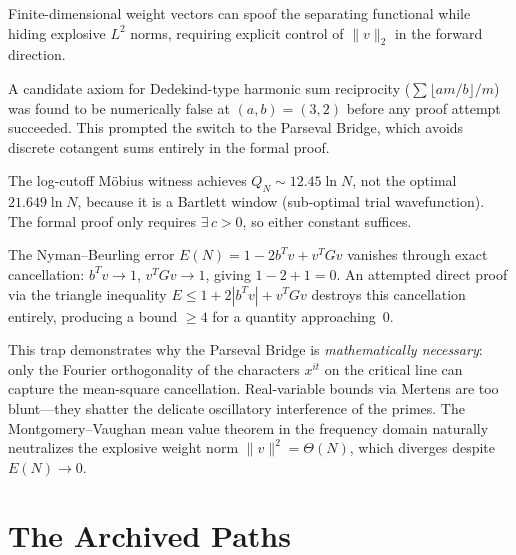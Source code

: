 \documentclass[11pt,a4paper]{article}
\begin{document}
\begin{discovery}
Finite-dimensional weight vectors can spoof the separating functional
while hiding explosive $L^2$ norms, requiring explicit control of
$\|v\|_2$ in the forward direction.
\end{discovery}

\begin{discovery}
A candidate axiom for Dedekind-type harmonic sum reciprocity
($\sum \lfloor am/b \rfloor / m$) was found to be numerically false
at $(a,b) = (3,2)$ before any proof attempt succeeded. This prompted
the switch to the Parseval Bridge, which avoids discrete cotangent
sums entirely in the formal proof.
\end{discovery}

\begin{discovery}
The log-cutoff M\"obius witness achieves $Q_N \sim 12.45 \ln N$, not
the optimal $21.649 \ln N$, because it is a Bartlett window (sub-optimal
trial wavefunction). The formal proof only requires $\exists\,c > 0$,
so either constant suffices.
\end{discovery}

\begin{discovery}
\label{disc:triangle}
The Nyman--Beurling error $E(N) = 1 - 2b^Tv + v^TGv$ vanishes through
exact cancellation: $b^Tv \to 1$, $v^TGv \to 1$, giving $1-2+1=0$.
An attempted direct proof via the triangle inequality
$E \le 1 + 2|b^Tv| + v^TGv$ destroys this cancellation entirely,
producing a bound $\ge 4$ for a quantity approaching~$0$.

This trap demonstrates why the Parseval Bridge is
\emph{mathematically necessary}: only the Fourier orthogonality
of the characters $x^{it}$ on the critical line can capture the
mean-square cancellation. Real-variable bounds via Mertens are
too blunt---they shatter the delicate oscillatory interference of
the primes. The Montgomery--Vaughan mean value theorem in the
frequency domain naturally neutralizes the explosive weight norm
$\|v\|^2 = \Theta(N)$, which diverges despite $E(N) \to 0$.
\end{discovery}

\section{The Archived Paths}
\end{document}
